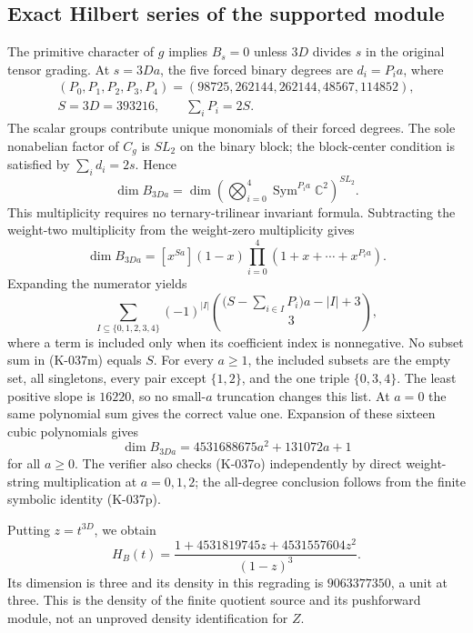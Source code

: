 \subsection*{Exact Hilbert series of the supported module}

The primitive character of $g$ implies $B_s=0$ unless
$3D$ divides $s$ in the original tensor grading.
At $s=3Da$, the five forced binary degrees are $d_i=P_i a$,
where
\[
 \begin{gathered}
 (P_0,P_1,P_2,P_3,P_4)=(98725,262144,262144,48567,114852),\\
 S=3D=393216,\qquad\sum_iP_i=2S.
 \end{gathered}                                          \tag{K-037m}
\]
The scalar groups contribute unique monomials of their
forced degrees. The sole nonabelian factor of $C_g$
is $SL_2$ on the binary block; the block-center condition
is satisfied by $\sum_i d_i=2s$. Hence
\[
 \dim B_{3Da}
   =\dim\left(\bigotimes_{i=0}^4
                 \operatorname{Sym}^{P_i a}\mathbb C^2\right)^{SL_2}.
                                                            \tag{K-037n}
\]
This multiplicity requires no ternary-trilinear invariant
formula. Subtracting the weight-two multiplicity from the
weight-zero multiplicity gives
\[
 \dim B_{3Da}
     =[x^{Sa}](1-x)\prod_{i=0}^4(1+x+\cdots+x^{P_i a}).
                                                            \tag{K-037o}
\]
Expanding the numerator yields
\[
 \sum_{I\subseteq\{0,1,2,3,4\}}(-1)^{|I|}
       {\bigl(S-\sum_{i\in I}P_i\bigr)a-|I|+3\choose3},
                                                            \tag{K-037p}
\]
where a term is included only when its coefficient index
is nonnegative. No subset sum in (K-037m) equals $S$.
For every $a\ge1$, the included subsets are the empty set,
all singletons, every pair except $\{1,2\}$, and the one
triple $\{0,3,4\}$. The least positive slope is $16220$,
so no small-$a$ truncation changes this list. At $a=0$
the same polynomial sum gives the correct value one.
Expansion of these sixteen cubic polynomials gives
\[
                     \dim B_{3Da}
                       =4531688675a^2+131072a+1           \tag{K-037q}
\]
for all $a\ge0$. The verifier also checks (K-037o)
independently by direct weight-string multiplication at
$a=0,1,2$; the all-degree conclusion follows from the
finite symbolic identity (K-037p).

Putting $z=t^{3D}$, we obtain
\[
 H_B(t)=
       \frac{1+4531819745z+4531557604z^2}{(1-z)^3}.         \tag{K-037r}
\]
Its dimension is three and its density in this regrading
is $9063377350$, a unit at three. This is the density of
the finite quotient source and its pushforward module,
not an unproved density identification for $Z$.

